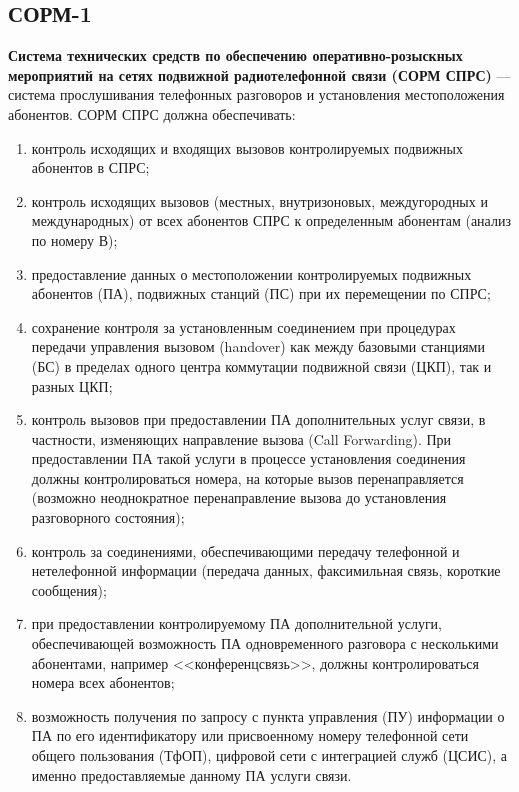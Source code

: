 \subsection{СОРМ-1}
\textbf{Система технических средств по обеспечению оперативно-розыскных мероприятий на сетях подвижной радиотелефонной связи (СОРМ СПРС)} --- система прослушивания телефонных разговоров и установления местоположения абонентов.
СОРМ СПРС должна обеспечивать\cite{sorm_sorm1}:
\begin{enumerate}
\item контроль исходящих и входящих вызовов контролируемых подвижных абонентов в СПРС;
\item контроль исходящих вызовов (местных, внутризоновых, междугородных и международных) от всех абонентов СПРС к определенным абонентам (анализ по номеру В);
\item предоставление данных о местоположении контролируемых подвижных абонентов (ПА), подвижных станций (ПС) при их перемещении по СПРС;
\item сохранение контроля за установленным соединением при процедурах передачи управления вызовом (handover) как между базовыми станциями (БС) в пределах одного центра коммутации подвижной связи (ЦКП), так и разных ЦКП;
\item контроль вызовов при предоставлении ПА дополнительных услуг связи, в частности, изменяющих направление вызова (Call Forwarding). При предоставлении ПА такой услуги в процессе установления соединения должны контролироваться номера, на которые вызов перенаправляется (возможно неоднократное перенаправление вызова до установления разговорного состояния);
\item контроль за соединениями, обеспечивающими передачу телефонной и нетелефонной информации (передача данных, факсимильная связь, короткие сообщения);
\item при предоставлении контролируемому ПА дополнительной услуги, обеспечивающей возможность ПА одновременного разговора с несколькими абонентами, например <<конференцсвязь>>, должны контролироваться номера всех абонентов;
\item возможность получения по запросу с пункта управления (ПУ) информации о ПА по его идентификатору или присвоенному номеру телефонной сети общего пользования (ТфОП), цифровой сети с интеграцией служб (ЦСИС), а именно предоставляемые данному ПА услуги связи.
\end{enumerate}
